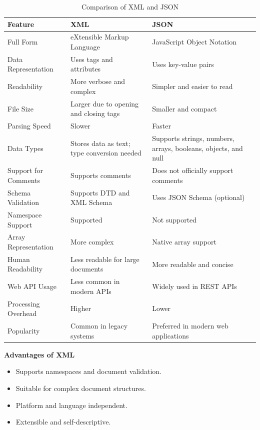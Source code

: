 \documentclass{article}
\begin{document}
\begin{itemize}[label=]
{        \begin{table}[h]
        \centering
        \renewcommand{\arraystretch}{1.3}
        \begin{tabular}{|p{4cm}|p{5cm}|p{5cm}|}
        \hline
        \textbf{Feature} & \textbf{XML} & \textbf{JSON} \\
        \hline
        Full Form & eXtensible Markup Language & JavaScript Object Notation \\
        \hline
        Data Representation & Uses tags and attributes & Uses key-value pairs \\
        \hline
        Readability & More verbose and complex & Simpler and easier to read \\
        \hline
        File Size & Larger due to opening and closing tags & Smaller and compact \\
        \hline
        Parsing Speed & Slower & Faster \\
        \hline
        Data Types & Stores data as text; type conversion needed & Supports strings, numbers, arrays, booleans, objects, and null \\
        \hline
        Support for Comments & Supports comments & Does not officially support comments \\
        \hline
        Schema Validation & Supports DTD and XML Schema & Uses JSON Schema (optional) \\
        \hline
        Namespace Support & Supported & Not supported \\
        \hline
        Array Representation & More complex & Native array support \\
        \hline
        Human Readability & Less readable for large documents & More readable and concise \\
        \hline
        Web API Usage & Less common in modern APIs & Widely used in REST APIs \\
        \hline
        Processing Overhead & Higher & Lower \\
        \hline
        Popularity & Common in legacy systems & Preferred in modern web applications \\
        \hline
        \end{tabular}
        \caption{Comparison of XML and JSON}
        \label{tab:xmljson}
        \end{table}

        \textbf{Advantages of XML}

        \begin{itemize}
            \item Supports namespaces and document validation.
            \item Suitable for complex document structures.
            \item Platform and language independent.
            \item Extensible and self-descriptive.
        \end{itemize}

}
\end{itemize}
\end{document}

